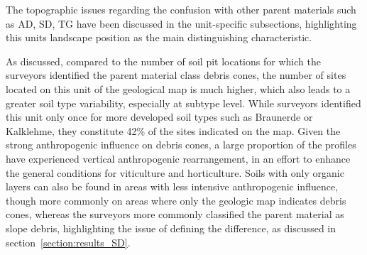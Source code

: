 \documentclass[preprint,12pt,authoryear]{elsarticle}
\begin{document}
The topographic issues regarding the confusion with other parent materials such as AD, SD, TG have been discussed in the unit-specific subsections, highlighting this units landscape position as the main distinguishing characteristic.

As discussed, compared to the number of soil pit locations for which the surveyors identified the parent material class debris cones, the number of sites located on this unit of the geological map is much higher, which also leads to a greater soil type variability, especially at subtype level. While surveyors identified this unit only once for more developed soil types such as Braunerde or Kalklehme, they constitute 42\% of the sites indicated on the map. Given the strong anthropogenic influence on debris cones, a large proportion of the profiles have experienced vertical anthropogenic rearrangement, in an effort to enhance the general conditions for viticulture and horticulture. Soils with only organic layers can also be found in areas with less intensive anthropogenic influence, though more commonly on areas where only the geologic map indicates debris cones, whereas the surveyors more commonly classified the parent material as slope debris, highlighting the issue of defining the difference, as discussed in section~\ref{section:results_SD}.
\end{document}
